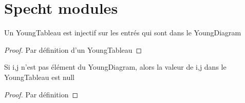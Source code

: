 \chapter{Specht modules}

\begin{theorem}[injEntry]
    \label{thm:injEntry}
    \leanok
    Un YoungTableau est injectif sur les entrés qui sont dans le YoungDiagram
\end{theorem}
\begin{proof}
    \leanok
    Par définition d'un YoungTableau
\end{proof}


\begin{theorem}[zeros]
    \label{thm:zeros}
    \leanok
    Si i,j n'est pas élément du YoungDiagram, alors la valeur de i,j dans le YoungTableau est null
\end{theorem}
\begin{proof}
    \leanok
    Par définition
\end{proof}